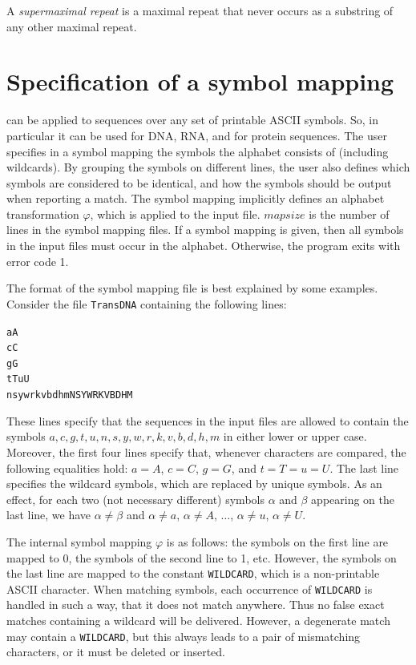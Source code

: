 \documentclass[12pt,titlepage]{article}
\newcommand{\WILDCARD}{\texttt{WILDCARD}\xspace}
\newenvironment{LargeOutput}{%
 \begin{footnotesize}
 \begin{alltt}}{%
 \end{alltt}
 \end{footnotesize}%
 \addvspace{-\medskipamount}
}
\begin{document}
A \emph{supermaximal repeat} is a maximal repeat that never occurs
as a substring of any other maximal repeat.

\section{Specification of a symbol mapping}\label{Symbolmap}
\MKV can be applied to sequences over any set of printable ASCII symbols.
So, in particular it can be used for DNA, RNA, and for protein sequences. 
The user specifies in a  symbol mapping the symbols the
alphabet consists of (including  wildcards). By grouping the 
symbols on different lines, the user also defines which symbols are 
considered to be
identical, and how the symbols should be output when reporting a match.
The symbol mapping implicitly defines an alphabet transformation 
\(\varphi\), which is applied to the input file. \(\mathit{mapsize}\) is
the number of lines in the symbol mapping files. If a symbol mapping is
given, then all symbols in the input files must occur in the alphabet.
Otherwise, the program exits with  error code 1.

The format of the symbol mapping file is best explained by 
some examples. Consider the file \texttt{TransDNA} containing the following 
lines:

\begin{LargeOutput}
aA
cC
gG
tTuU
nsywrkvbdhmNSYWRKVBDHM
\end{LargeOutput}

These lines specify that the sequences in the input files 
are allowed to contain the symbols \(a,c,g,t,u,n,s,y,w,r,k,v,b,d,h,m\) 
in either lower or upper case. Moreover, the first four lines specify that,
whenever characters are compared, the following equalities hold:
\(a=A\), \(c=C\), \(g=G\), and \(t=T=u=U\). The 
last line specifies the 
wildcard symbols, which are replaced by unique 
symbols. As an effect, for each two (not necessary different)
symbols \(\alpha\) and \(\beta\) appearing on the last line,
we have \(\alpha\neq\beta\) and 
\(\alpha\neq a\), \(\alpha\neq A\), $\ldots$, 
\(\alpha\neq u\), \(\alpha\neq U\).

The internal symbol mapping \(\varphi\) is as follows: the symbols on the 
first line are mapped to 0, 
the symbols of the second line to 1, etc. However, the symbols on
the last line are mapped to the constant
\WILDCARD, which is a non-printable
ASCII character. When matching symbols, each occurrence of \WILDCARD 
is handled in such a way, that it does not match anywhere. Thus no false 
exact matches containing a 
wildcard will be delivered. 
However, a degenerate match may contain a \WILDCARD, but this always leads
to a pair of mismatching characters, or it must be deleted or inserted. 
\end{document}
